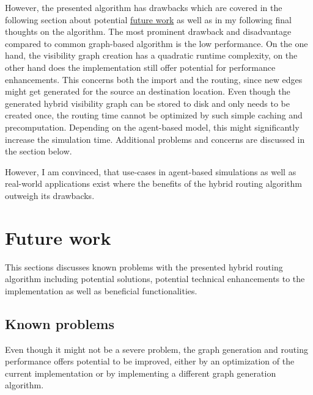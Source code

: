 However, the presented algorithm has drawbacks which are covered in the following section about potential \hyperref[sec:future-work]{future work} as well as in my following final thoughts on the algorithm.
The most prominent drawback and disadvantage compared to common graph-based algorithm is the low performance.
On the one hand, the visibility graph creation has a quadratic runtime complexity, on the other hand does the implementation still offer potential for performance enhancements.
This concerns both the import and the routing, since new edges might get generated for the source an destination location.
Even though the generated hybrid visibility graph can be stored to disk and only needs to be created once, the routing time cannot be optimized by such simple caching and precomputation.
Depending on the agent-based model, this might significantly increase the simulation time.
Additional problems and concerns are discussed in the section below.

However, I am convinced, that use-cases in agent-based simulations as well as real-world applications exist where the benefits of the hybrid routing algorithm outweigh its drawbacks.

\section{Future work}
\label{sec:future-work}

	This sections discusses known problems with the presented hybrid routing algorithm including potential solutions, potential technical enhancements to the implementation as well as beneficial functionalities.

	\subsection{Known problems}
		Even though it might not be a severe problem, the graph generation and routing performance offers potential to be improved, either by an optimization of the current implementation or by implementing a different graph generation algorithm.
		
